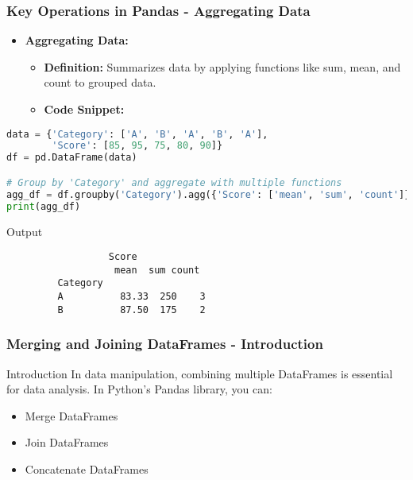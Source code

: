\documentclass[aspectratio=169]{beamer}
\begin{document}
\begin{frame}[fragile]
    \frametitle{Key Operations in Pandas - Aggregating Data}
    \begin{itemize}
        \item \textbf{Aggregating Data:}
        \begin{itemize}
            \item \textbf{Definition:} Summarizes data by applying functions like sum, mean, and count to grouped data.
            \item \textbf{Code Snippet:}
        \end{itemize}
    \end{itemize}
    \begin{lstlisting}[language=Python]
data = {'Category': ['A', 'B', 'A', 'B', 'A'],
        'Score': [85, 95, 75, 80, 90]}
df = pd.DataFrame(data)

# Group by 'Category' and aggregate with multiple functions
agg_df = df.groupby('Category').agg({'Score': ['mean', 'sum', 'count']})
print(agg_df)
    \end{lstlisting}
    \begin{block}{Output}
         \begin{verbatim}
                  Score         
                   mean  sum count
         Category                  
         A          83.33  250    3
         B          87.50  175    2
         \end{verbatim}
    \end{block}
\end{frame}

\begin{frame}[fragile]
    \frametitle{Merging and Joining DataFrames - Introduction}
    \begin{block}{Introduction}
        In data manipulation, combining multiple DataFrames is essential for data analysis.
        In Python's Pandas library, you can:
        \begin{itemize}
            \item Merge DataFrames
            \item Join DataFrames
            \item Concatenate DataFrames
        \end{itemize}
    \end{block}
\end{frame}
\end{document}
